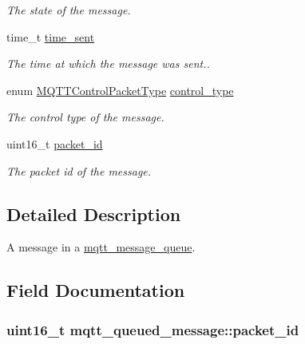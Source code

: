 \begin{DoxyCompactItemize}
\begin{DoxyCompactList}\small\item\em The state of the message. \end{DoxyCompactList}\item 
time\+\_\+t \hyperlink{structmqtt__queued__message_a04a6c9a1c732d33e59931ceefc8ac199}{time\+\_\+sent}
\begin{DoxyCompactList}\small\item\em The time at which the message was sent.. \end{DoxyCompactList}\item 
enum \hyperlink{group__unpackers_gacbd36b88ec7f62bc161b07e1a0aed679}{M\+Q\+T\+T\+Control\+Packet\+Type} \hyperlink{structmqtt__queued__message_a66ebb83c15a27831577862461723da3f}{control\+\_\+type}\hypertarget{structmqtt__queued__message_a66ebb83c15a27831577862461723da3f}{}\label{structmqtt__queued__message_a66ebb83c15a27831577862461723da3f}

\begin{DoxyCompactList}\small\item\em The control type of the message. \end{DoxyCompactList}\item 
uint16\+\_\+t \hyperlink{structmqtt__queued__message_ac20454e900b6d29e4d25edcdad57a99b}{packet\+\_\+id}
\begin{DoxyCompactList}\small\item\em The packet id of the message. \end{DoxyCompactList}\end{DoxyCompactItemize}


\subsection{Detailed Description}
A message in a \hyperlink{structmqtt__message__queue}{mqtt\+\_\+message\+\_\+queue}. 

\subsection{Field Documentation}
\subsubsection[{\texorpdfstring{packet\+\_\+id}{packet_id}}]{\setlength{\rightskip}{0pt plus 5cm}uint16\+\_\+t mqtt\+\_\+queued\+\_\+message\+::packet\+\_\+id}\hypertarget{structmqtt__queued__message_ac20454e900b6d29e4d25edcdad57a99b}{}\label{structmqtt__queued__message_ac20454e900b6d29e4d25edcdad57a99b}


